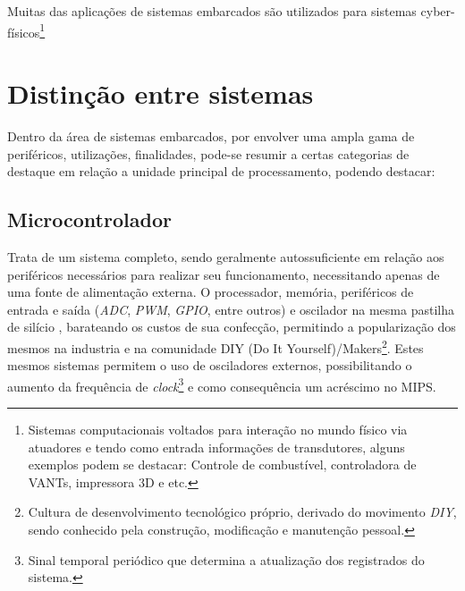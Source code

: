Muitas das aplicações de sistemas embarcados são utilizados para sistemas cyber-físicos\footnote{Sistemas computacionais
voltados para interação no mundo físico via atuadores e tendo como entrada informações de transdutores, alguns exemplos
podem se destacar: Controle de combustível, controladora de VANTs, impressora 3D e etc.}
\fi

\section{Distinção entre sistemas}
Dentro da área de sistemas embarcados, por envolver uma ampla gama de periféricos, utilizações, finalidades, pode-se resumir a certas categorias de destaque em relação a unidade principal de processamento, podendo destacar:

\subsection{Microcontrolador}

Trata de um sistema completo, sendo geralmente autossuficiente em relação aos periféricos necessários para realizar seu funcionamento, necessitando apenas de uma fonte de alimentação externa. O processador, memória, periféricos de entrada e saída (\textit{ADC}, \textit{PWM}, \textit{GPIO}, entre outros) e oscilador na mesma pastilha de silício , barateando os custos de sua confecção, permitindo a popularização dos mesmos na industria e na comunidade DIY (Do It Yourself)/Makers\footnote{Cultura de desenvolvimento tecnológico próprio, derivado do movimento \textit{DIY}, sendo conhecido pela construção, modificação e manutenção pessoal.}. Estes mesmos
sistemas permitem o uso de osciladores externos, possibilitando o aumento da frequência de \textit{clock}\footnote{Sinal temporal periódico que determina a atualização dos registrados do sistema.} e como consequência um acréscimo no MIPS.



